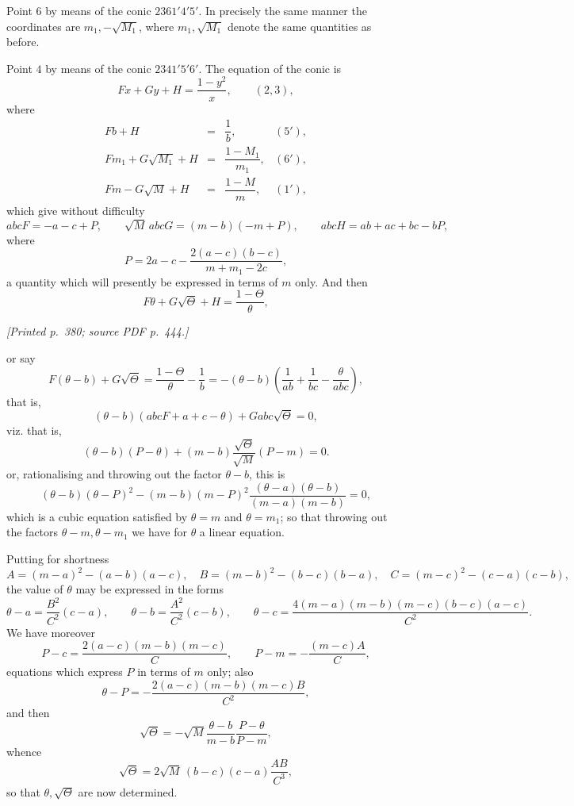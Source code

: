 \documentclass[11pt,a4paper]{article}
\newcommand{\sourcepage}[2]{\par\smallskip\noindent\textit{[Printed p.~#1; source PDF p.~#2.]}\par\smallskip}
\begin{document}
Point $6$ by means of the conic $2361'4'5'$. In precisely the same manner the
coordinates are $m_1,-\sqrt{M_1}$, where $m_1,\sqrt{M_1}$ denote the same quantities
as before.

Point $4$ by means of the conic $2341'5'6'$. The equation of the conic is
\[
Fx+Gy+H=\frac{1-y^2}{x},\qquad (2,3),
\]
where
\[
\begin{array}{rcll}
Fb+H&=&\dfrac1b, &(5'),\\[1mm]
Fm_1+G\sqrt{M_1}+H&=&\dfrac{1-M_1}{m_1}, &(6'),\\[1mm]
Fm-G\sqrt M+H&=&\dfrac{1-M}{m}, &(1'),
\end{array}
\]
which give without difficulty
\[
abcF=-a-c+P,\qquad
\sqrt M\,abcG=(m-b)(-m+P),\qquad
abcH=ab+ac+bc-bP,
\]
where
\[
P=2a-c-\frac{2(a-c)(b-c)}{m+m_1-2c},
\]
a quantity which will presently be expressed in terms of $m$ only. And then
\[
F\theta+G\sqrt\Theta+H=\frac{1-\Theta}{\theta},
\]

\sourcepage{380}{444}
\noindent
or say
\[
F(\theta-b)+G\sqrt\Theta=\frac{1-\Theta}{\theta}-\frac1b
=-(\theta-b)\left(\frac1{ab}+\frac1{bc}-\frac{\theta}{abc}\right),
\]
that is,
\[
(\theta-b)(abcF+a+c-\theta)+Gabc\sqrt\Theta=0,
\]
viz. that is,
\[
(\theta-b)(P-\theta)+(m-b)\frac{\sqrt\Theta}{\sqrt M}(P-m)=0.
\]
or, rationalising and throwing out the factor $\theta-b$, this is
\[
(\theta-b)(\theta-P)^2
-(m-b)(m-P)^2\frac{(\theta-a)(\theta-b)}{(m-a)(m-b)}=0,
\]
which is a cubic equation satisfied by $\theta=m$ and $\theta=m_1$; so that throwing out
the factors $\theta-m,\theta-m_1$ we have for $\theta$ a linear equation.

Putting for shortness
\[
A=(m-a)^2-(a-b)(a-c),\quad
B=(m-b)^2-(b-c)(b-a),\quad
C=(m-c)^2-(c-a)(c-b),
\]
the value of $\theta$ may be expressed in the forms
\[
\theta-a=\frac{B^2}{C^2}(c-a),\qquad
\theta-b=\frac{A^2}{C^2}(c-b),\qquad
\theta-c=\frac{4(m-a)(m-b)(m-c)(b-c)(a-c)}{C^2}.
\]
We have moreover
\[
P-c=\frac{2(a-c)(m-b)(m-c)}{C},\qquad
P-m=-\frac{(m-c)A}{C},
\]
equations which express $P$ in terms of $m$ only; also
\[
\theta-P=-\frac{2(a-c)(m-b)(m-c)B}{C^2},
\]
and then
\[
\sqrt\Theta=-\sqrt M\frac{\theta-b}{m-b}\frac{P-\theta}{P-m},
\]
whence
\[
\sqrt\Theta=2\sqrt M\,(b-c)(c-a)\frac{AB}{C^3},
\]
so that $\theta,\sqrt\Theta$ are now determined.
\end{document}
